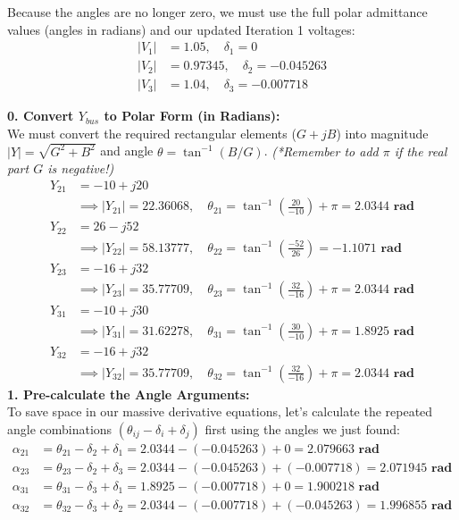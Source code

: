 \documentclass[11pt]{article}
\begin{document}
\begin{stepbox}
Because the angles are no longer zero, we must use the full polar admittance values (angles in radians) and our updated Iteration 1 voltages:
\begin{align*}
    |V_1| &= 1.05, \quad \delta_1 = 0 \\
    |V_2| &= 0.97345, \quad \delta_2 = -0.045263 \\
    |V_3| &= 1.04, \quad \delta_3 = -0.007718
\end{align*}

\textbf{0. Convert $Y_{bus}$ to Polar Form (in Radians):}\\
We must convert the required rectangular elements ($G + jB$) into magnitude $|Y| = \sqrt{G^2 + B^2}$ and angle $\theta = \tan^{-1}(B/G)$. \textit{(*Remember to add $\pi$ if the real part $G$ is negative!)}
\begin{align*}
    Y_{21} &= -10 + j20 \\
    &\implies |Y_{21}| = \mathbf{22.36068}, \quad \theta_{21} = \tan^{-1}\left(\frac{20}{-10}\right) + \pi = \mathbf{2.0344 \text{ rad}} \\[0.2cm]
    Y_{22} &= 26 - j52 \\
    &\implies |Y_{22}| = \mathbf{58.13777}, \quad \theta_{22} = \tan^{-1}\left(\frac{-52}{26}\right) = \mathbf{-1.1071 \text{ rad}} \\[0.2cm]
    Y_{23} &= -16 + j32 \\
    &\implies |Y_{23}| = \mathbf{35.77709}, \quad \theta_{23} = \tan^{-1}\left(\frac{32}{-16}\right) + \pi = \mathbf{2.0344 \text{ rad}} \\[0.2cm]
    Y_{31} &= -10 + j30 \\
    &\implies |Y_{31}| = \mathbf{31.62278}, \quad \theta_{31} = \tan^{-1}\left(\frac{30}{-10}\right) + \pi = \mathbf{1.8925 \text{ rad}} \\[0.2cm]
    Y_{32} &= -16 + j32 \\
    &\implies |Y_{32}| = \mathbf{35.77709}, \quad \theta_{32} = \tan^{-1}\left(\frac{32}{-16}\right) + \pi = \mathbf{2.0344 \text{ rad}}
\end{align*}
\textbf{1. Pre-calculate the Angle Arguments:}\\
To save space in our massive derivative equations, let's calculate the repeated angle combinations $(\theta_{ij} - \delta_i + \delta_j)$ first using the angles we just found:
\begin{align*}
    \alpha_{21} &= \theta_{21} - \delta_2 + \delta_1 = 2.0344 - (-0.045263) + 0 = \mathbf{2.079663 \text{ rad}} \\
    \alpha_{23} &= \theta_{23} - \delta_2 + \delta_3 = 2.0344 - (-0.045263) + (-0.007718) = \mathbf{2.071945 \text{ rad}} \\
    \alpha_{31} &= \theta_{31} - \delta_3 + \delta_1 = 1.8925 - (-0.007718) + 0 = \mathbf{1.900218 \text{ rad}} \\
    \alpha_{32} &= \theta_{32} - \delta_3 + \delta_2 = 2.0344 - (-0.007718) + (-0.045263) = \mathbf{1.996855 \text{ rad}}
\end{align*}


\end{stepbox}
\end{document}
